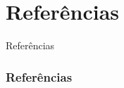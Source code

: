 \documentclass{beamer}
\begin{document}
\section{Referências}
\begin{frame}{Referências}%
\frametitle{Referências}
\small
\begin{center}
\tiny


\end{center}
\end{frame}
 
\end{document}
